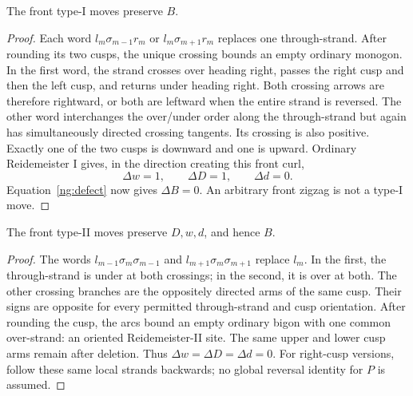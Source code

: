 \begin{lemma}\label{ng:front-I}
The front type-I moves preserve $B$.
\end{lemma}
\begin{proof}
Each word $l_m\sigma_{m-1}r_m$ or $l_m\sigma_{m+1}r_m$ replaces one
through-strand. After rounding its two cusps, the unique crossing bounds
an empty ordinary monogon. In the first word, the strand crosses over
heading right, passes the right cusp and then the left cusp, and returns
under heading right. Both crossing arrows are therefore rightward, or
both are leftward when the entire strand is reversed. The other word
interchanges the over/under order along the through-strand but again
has simultaneously directed crossing tangents. Its crossing is also
positive. Exactly one of the two cusps is downward and one is upward.
Ordinary Reidemeister I gives, in the direction creating this front curl,
\begin{equation}\label{ng:type-I-counts}
 \Delta w=1,\qquad \Delta D=1,\qquad \Delta d=0.
\end{equation}
Equation~\eqref{ng:defect} now gives $\Delta B=0$.
An arbitrary front zigzag is not a type-I move.
\end{proof}

\begin{lemma}\label{ng:front-II}
The front type-II moves preserve $D,w,d$, and hence $B$.
\end{lemma}
\begin{proof}
The words $l_{m-1}\sigma_m\sigma_{m-1}$ and
$l_{m+1}\sigma_m\sigma_{m+1}$ replace $l_m$. In the first, the
through-strand is under at both crossings; in the second, it is over
at both. The other crossing branches are the oppositely directed arms
of the same cusp. Their signs are opposite for every permitted
through-strand and cusp orientation. After rounding the cusp, the arcs
bound an empty ordinary bigon with one common over-strand: an oriented
Reidemeister-II site. The same upper and lower cusp arms remain after
deletion. Thus $\Delta w=\Delta D=\Delta d=0$.
For right-cusp versions, follow these same local strands backwards;
no global reversal identity for $P$ is assumed.
\end{proof}

